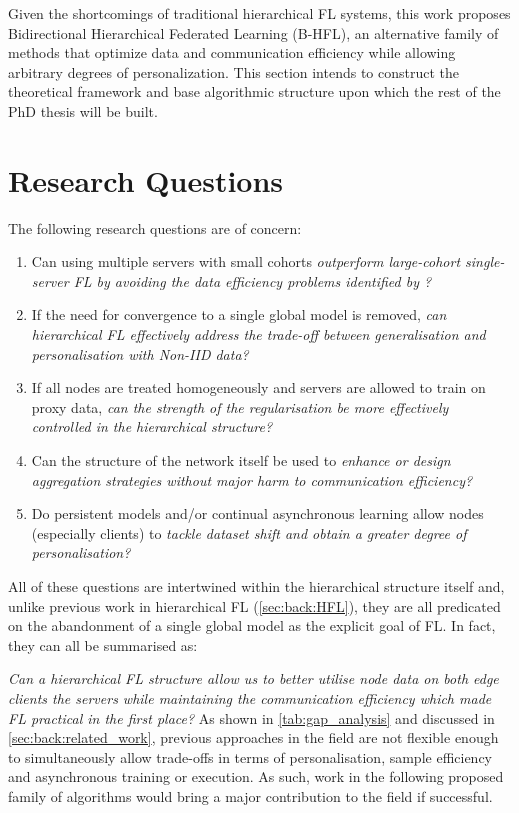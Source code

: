 
Given the shortcomings of traditional hierarchical FL systems, this work proposes Bidirectional Hierarchical Federated Learning (B-HFL), an alternative family of methods that optimize data and communication efficiency while allowing arbitrary degrees of personalization. This section intends to construct the theoretical framework and base algorithmic structure upon which the rest of the PhD thesis will be built.

\section{Research Questions}
The following research questions are of concern:
\begin{enumerate}
    \item Can using multiple servers with small cohorts \emph{outperform large-cohort single-server FL by avoiding the data efficiency problems identified by \citet{LargeCohorts}?}
    \item If the need for convergence to a single global model is removed, \emph{can hierarchical FL effectively address the trade-off between generalisation and personalisation with Non-IID data?}
    \item If all nodes are treated homogeneously and servers are allowed to train on proxy data, \emph{can the strength of the regularisation be more effectively controlled in the hierarchical structure?}
    \item Can the structure of the network itself be used to \emph{enhance or design aggregation strategies without major harm to communication efficiency?}
    \item Do persistent models and/or continual asynchronous learning allow nodes (especially clients) to \emph{tackle dataset shift and obtain a greater degree of personalisation?}
\end{enumerate}
All of these questions are intertwined within the hierarchical structure itself and, unlike previous work in hierarchical FL (\cref{sec:back:HFL}), they are all predicated on the abandonment of a single global model as the explicit goal of FL\@. In fact, they can all be summarised as:

\emph{Can a hierarchical FL structure allow us to better utilise node data on both edge clients the servers while maintaining the communication efficiency which made FL practical in the first place?}
As shown in \cref{tab:gap_analysis} and discussed in \cref{sec:back:related_work}, previous approaches in the field are not flexible enough to simultaneously allow trade-offs in terms of personalisation, sample efficiency and asynchronous training or execution. As such, work in the following proposed family of algorithms would bring a major contribution to the field if successful.
